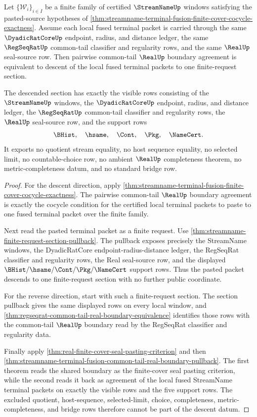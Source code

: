 \begin{theorem}
\label{thm:streamname-terminal-fusion-cocycle-section-descent}
Let $\{\mathcal W_i\}_{i\in I}$ be a finite family of certified
$\StreamNameUp$ windows satisfying the pasted-source hypotheses of
\autoref{thm:streamname-terminal-fusion-finite-cover-cocycle-exactness}.
Assume each local fused terminal packet is carried through the same
$\DyadicRatCoreUp$ endpoint, radius, and distance ledger, the same
$\RegSeqRatUp$ common-tail classifier and regularity rows, and the same
$\RealUp$ seal-source row. Then pairwise common-tail $\RealUp$ boundary
agreement is equivalent to descent of the local fused terminal packets to one
finite-request section.

The descended section has exactly the visible rows consisting of the
$\StreamNameUp$ windows, the $\DyadicRatCoreUp$ endpoint, radius, and distance
ledger, the $\RegSeqRatUp$ common-tail classifier and regularity rows, the
$\RealUp$ seal-source row, and the support rows
$$
\BHist,\quad \hsame,\quad \Cont,\quad \Pkg,\quad \NameCert.
$$
It exports no quotient stream equality, no host sequence equality, no selected
limit, no countable-choice row, no ambient $\RealUp$ completeness theorem, no
metric-completeness datum, and no standard bridge row.
\end{theorem}
\begin{proof}
For the descent direction, apply
\autoref{thm:streamname-terminal-fusion-finite-cover-cocycle-exactness}. The
pairwise common-tail $\RealUp$ boundary agreement is exactly the cocycle
condition for the certified local terminal packets to paste to one fused
terminal packet over the finite family.

Next read the pasted terminal packet as a finite request. Use
\autoref{thm:streamname-finite-request-section-pullback}. The pullback exposes
precisely the StreamName windows, the DyadicRatCore endpoint-radius-distance
ledger, the RegSeqRat classifier and regularity rows, the Real seal-source
row, and the displayed $\BHist/\hsame/\Cont/\Pkg/\NameCert$ support rows.
Thus the pasted packet descends to one finite-request section with no further
public coordinate.

For the reverse direction, start with such a finite-request section. The
section pullback gives the same displayed rows on every local window, and
\autoref{thm:regseqrat-common-tail-real-boundary-equivalence} identifies those
rows with the common-tail $\RealUp$ boundary read by the RegSeqRat classifier
and regularity data.

Finally apply \autoref{thm:real-finite-cover-seal-pasting-criterion} and then
\autoref{thm:streamname-terminal-fusion-common-tail-real-boundary-pullback}.
The first theorem reads the shared boundary as the finite-cover seal pasting
criterion, while the second reads it back as agreement of the local fused
StreamName terminal packets on exactly the visible rows and the five support
rows. The excluded quotient, host-sequence, selected-limit, choice,
completeness, metric-completeness, and bridge rows therefore cannot be part of
the descent datum.
\end{proof}

